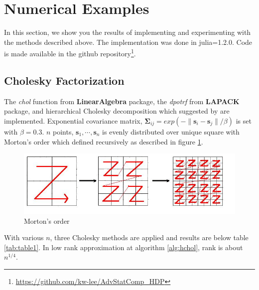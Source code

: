 \section{Numerical Examples}

In this section, we show you the results of implementing and experimenting with the methods described above. The implementation was done in julia=1.2.0. Code is made available in the github repository\footnote{\url{https://github.com/kw-lee/AdvStatComp_HDP}}.

\subsection{Cholesky Factorization}

The \textit{chol} function from \textbf{LinearAlgebra} package, the \textit{dpotrf} from \textbf{LAPACK} package, and hierarchical Cholesky decomposition which suggested by \citet{hackbusch2015hierarchical} are implemented. Exponential covariance matrix, $\boldsymbol{\Sigma}_{ij}=exp(-\lVert \mathbf{s}_i-\mathbf{s}_j \rVert/\beta)$ is set with $\beta=0.3$. $n$ points, $\mathbf{s}_1,\cdots,\mathbf{s}_n$ is evenly distributed over unique square with Morton's order which defined recursively as described in figure \ref{fig:morton}.

\begin{figure}[ht]
\centering
	\includegraphics[width=.5\linewidth]{figs/Morton.jpg}
	\caption{Morton's order\citep{salem2016comparative}}
	\label{fig:morton}
\end{figure}

With various $n$, three Cholesky methods are applied and results are below table \ref{tab:table1}. In low rank approximation at algorithm \ref{alg:hchol}, rank is about $n^{1/4}$.

